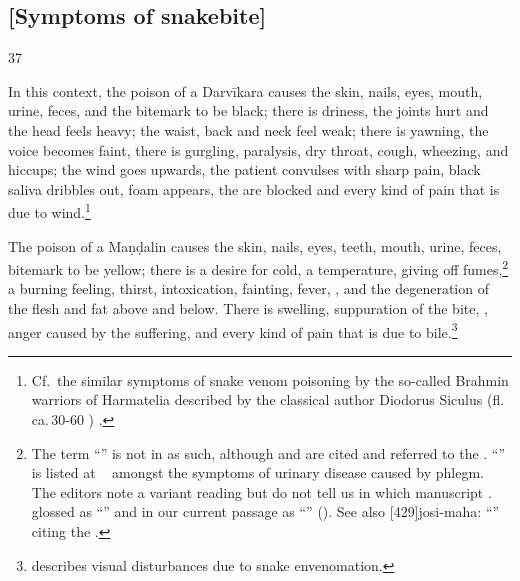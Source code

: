 \begin{translation}
\subsection{[Symptoms of snakebite]}

\item[37] 

In this context, the poison of a Darvīkara causes the skin, nails, eyes,
mouth, urine, feces, and the bitemark to be black; there is driness, the
joints hurt and the head feels heavy; the waist, back and neck feel weak;
there is yawning, the voice becomes faint, there is gurgling, paralysis,
dry throat, cough, wheezing, and hiccups; the wind goes upwards, the
patient convulses with sharp pain, black saliva dribbles out, foam
appears, the  are blocked and every kind of pain that
is due to wind.\footnote{Cf.\ the similar symptoms of snake venom
    poisoning by the so-called Brahmin warriors of Harmatelia described by
    the classical author Diodorus Siculus (fl.\,ca.\,30-60 \BCE)
    \citep[108]{egge-1975}.}


The poison of a Maṇḍalin causes the skin, nails, eyes, teeth, mouth,
urine, feces, bitemark  to be yellow; there is a desire for cold, a
temperature, giving off fumes,\footnote{The term
    “” is not in \cite[596]{moni-sans} as
    such, although  and  
    are
    cited and referred to the \SS. “” is
    listed at \SS\  amongst the symptoms of urinary disease
    caused by phlegm. The editors note a variant reading 
    but do not tell us in which manuscript \citep[291, n.\,3]{vulgate}.
     glossed  as
    “” and in our current passage as
    “” (\cite[573]{vulgate}).
    See also [429]{josi-maha}:  “” citing the \SS.} a burning feeling, thirst,
    intoxication, fainting, fever, , and the
    degeneration of the flesh and fat above and below. There is swelling,
    suppuration of the bite, , anger 
    caused by the suffering, and every kind of pain that is due to 
    bile.\footnote{\citet{ghos-2023} describes visual disturbances due to snake 
    envenomation.}


\end{translation}
